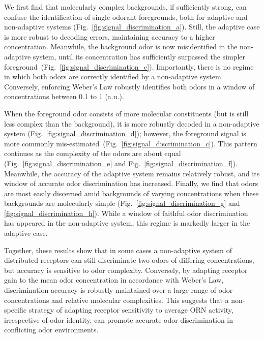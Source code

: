 We first find that molecularly complex backgrounds, if sufficiently strong, can confuse the identification of single odorant foregrounds, both for adaptive and non-adaptive systems (Fig.~\ref{fig:signal_discrimination_a}). Still, the adaptive case is more robust to decoding errors, maintaining accuracy to a higher concentration. Meanwhile, the background odor is now misidentified in the non-adaptive system, until its concentration has sufficiently surpassed the simpler foreground~(Fig.~\ref{fig:signal_discrimination_e}). Importantly, there is no regime in which both odors are correctly identified by a non-adaptive system. Conversely, enforcing Weber's Law robustly identifies both odors in a window of concentrations between 0.1 to 1 (a.u.).

When the foreground odor consists of more molecular constituents (but is still less complex than the background), it is more robustly decoded in a non-adaptive system (Fig.~\ref{fig:signal_discrimination_d}); however, the foreground signal is more commonly mis-estimated~(Fig.~\ref{fig:signal_discrimination_c}). This pattern continues as the complexity of the odors are about equal (Fig.~\ref{fig:signal_discrimination_e} and Fig.~\ref{fig:signal_discrimination_f}). Meanwhile, the accuracy of the adaptive system remains relatively robust, and its window of accurate odor discrimination has increased. Finally, we find that odors are most easily discerned amid backgrounds of varying concentrations when these backgrounds are molecularly simple (Fig.~\ref{fig:signal_discrimination_g} and \ref{fig:signal_discrimination_h}). While a window of faithful odor discrimination has appeared in the non-adaptive system, this regime is markedly larger in the adaptive case.

Together, these results show that in some cases a non-adaptive system of distributed receptors can still discriminate two odors of differing concentrations, but accuracy is sensitive to odor complexity. Conversely, by adapting receptor gain to the mean odor concentration in accordance with Weber's Law, discrimination accuracy is robustly maintained over a large range of odor concentrations and relative molecular complexities. This suggests that a non-specific strategy of adapting receptor sensitivity to average ORN activity, irrespective of odor identity, can promote accurate odor discrimination in conflicting odor environments.





